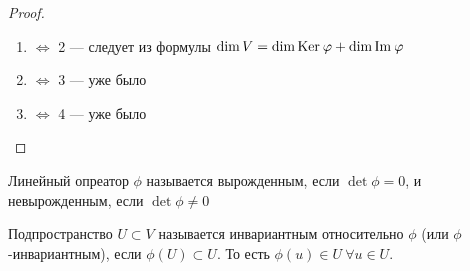 \begin{proof}
    \ 
    \begin{enumerate}
        \item $\Leftrightarrow$ 2 --- следует из формулы $\dim V = \dim \mathrm{Ker}\: \varphi + \dim \mathrm{Im\:} \varphi$
        \item $\Leftrightarrow$ 3 --- уже было
        \item $\Leftrightarrow$ 4 --- уже было
    \end{enumerate}
\end{proof}
\begin{Def}
    Линейный опреатор $\phi$ называется вырожденным, если $\det \phi = 0$, и невырожденным, если $\det \phi \neq 0$
\end{Def}
\begin{Def} 
    Подпространство $U \subset V$ называется инвариантным относительно $\phi$ (или $\phi$-инвариантным), если $\phi(U)\subset U$. То есть $\phi(u)\in U\ \forall u\in U$. 
\end{Def}

